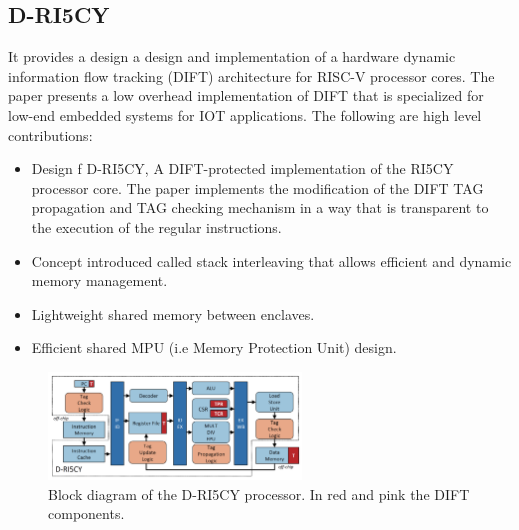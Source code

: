 \subsection{D-RI5CY \cite{D-RISCY}}
It provides a design a design and implementation of a hardware dynamic information flow 
tracking (DIFT) architecture for RISC-V processor cores. The paper presents a low 
overhead implementation of DIFT that is specialized for low-end embedded systems
for IOT applications. The following are high level contributions:
\begin{itemize}
  \item Design f D-RI5CY, A DIFT-protected implementation of the RI5CY processor core. 
        The paper implements the modification of the DIFT TAG propagation and TAG checking
        mechanism in a way that is transparent to the execution of the regular instructions. 
  \item Concept introduced called stack interleaving that allows efficient and dynamic memory management.
  \item Lightweight shared memory between enclaves.
  \item Efficient shared MPU (i.e Memory Protection Unit) design.
\end{itemize}

\begin{figure}[htbp!] 
  \centering    
  \includegraphics[width=0.6\textwidth]{D-RISCV}
  \caption[D-RISCY]{ Block diagram of the D-RI5CY processor. In red and pink the DIFT components. \cite{D-RISCY}}
  \label{fig:MTE}
  \end{figure}



